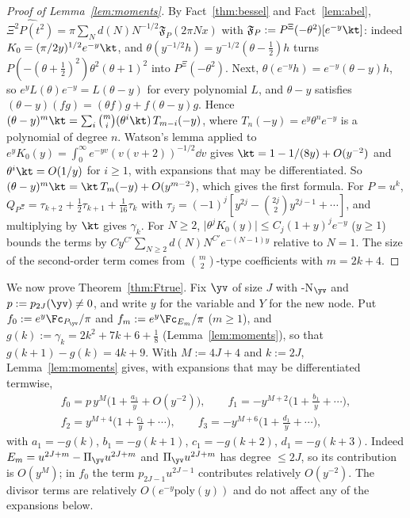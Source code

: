 \begin{proof}[Proof of Lemma~\textup{\ref{lem:moments}}]
By Fact~\ref{thm:bessel} and Fact~\ref{lem:abel},
$\widehat{\Xi^2P(t^2)}=\pi\sum_Nd(N)N^{-1/2}\mathfrak F_P(2\pi Nx)$ with
$\mathfrak F_P:=P^{\Xi}(-\theta^2)[e^{-y}\kt]$: indeed $K_0=(\pi/2y)^{1/2}e^{-y}\kt$, and
$\theta(y^{-1/2}h)=y^{-1/2}(\theta-\frac12)h$ turns $P(-(\theta+\frac12)^2)\theta^2(\theta+1)^2$ into $P^{\Xi}(-\theta^2)$.
Next, $\theta(e^{-y}h)=e^{-y}(\theta-y)h$, so $e^{y}L(\theta)e^{-y}=L(\theta-y)$ for every polynomial $L$, and $\theta-y$
satisfies $(\theta-y)(fg)=(\theta f)g+f(\theta-y)g$. Hence
$(\theta-y)^m\kt=\sum_i\binom mi(\theta^i\kt)\,T_{m-i}(-y)$, where $T_n(-y)=e^{y}\theta^ne^{-y}$ is a polynomial of
degree $n$. Watson's lemma applied to $e^yK_0(y)=\int_0^\infty e^{-yv}(v(v+2))^{-1/2}\dd v$ \cite{Olv74} gives
$\kt=1-1/(8y)+O(y^{-2})$ and $\theta^i\kt=O(1/y)$ for $i\ge1$, with expansions that may be differentiated. So
$(\theta-y)^m\kt=\kt\,T_m(-y)+O(y^{m-2})$, which gives the first formula. For $P=u^k$,
$Q_{P^\Xi}=\tau_{k+2}+\frac12\tau_{k+1}+\frac1{16}\tau_k$ with $\tau_j=(-1)^j[y^{2j}-\binom{2j}2y^{2j-1}+\cdots]$, and
multiplying by $\kt$ gives $\gamma_k$. For $N\ge2$, $\lvert\theta^jK_0(y)\rvert\le C_j(1+y)^je^{-y}$ ($y\ge1$) bounds the
terms by $Cy^{C'}\sum_{N\ge2}d(N)N^{C'}e^{-(N-1)y}$ relative to $N=1$. The size of the second-order term comes from
$\binom{m}{2}$-type coefficients with $m=2k+4$.
\end{proof}

We now prove Theorem~\ref{thm:Ftrue}.
Fix $\yv$ of size $J$ with \hyp{N}$_{\yv}$ and $p:=p_{2J}(\yv)\ne0$, and write
$y$ for the variable and $Y$ for the new node. Put $f_0:=e^y\Fc_{P_{\yv}}/\pi$ and $f_m:=e^y\Fc_{E_m}/\pi$ ($m\ge1$), and
$g(k):=\gamma_k=2k^2+7k+6+\frac18$ (Lemma~\ref{lem:moments}), so that $g(k+1)-g(k)=4k+9$. With $M:=4J+4$ and $k:=2J$,
Lemma~\ref{lem:moments} gives, with expansions that may be differentiated termwise,
\begin{gather*}
f_0=p\,y^M\bigl(1+\tfrac{a_1}y+O(y^{-2})\bigr),\qquad f_1=-y^{M+2}\bigl(1+\tfrac{b_1}y+\cdots\bigr),\\
f_2=y^{M+4}\bigl(1+\tfrac{c_1}y+\cdots\bigr),\qquad f_3=-y^{M+6}\bigl(1+\tfrac{d_1}y+\cdots\bigr),
\end{gather*}
with $a_1=-g(k)$, $b_1=-g(k+1)$, $c_1=-g(k+2)$, $d_1=-g(k+3)$. Indeed $E_m=u^{2J+m}-\Pi_{\yv}u^{2J+m}$ and
$\Pi_{\yv}u^{2J+m}$ has degree $\le2J$, so its contribution is $O(y^{M})$; in $f_0$ the term $p_{2J-1}u^{2J-1}$ contributes
relatively $O(y^{-2})$. The divisor terms are relatively $O(e^{-y}\mathrm{poly}(y))$ and do not affect any of the
expansions below.

